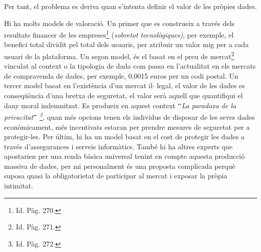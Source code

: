 \documentclass[12pt]{article}
\begin{document}
\begin{enumerate}
\vspace{\baselineskip}
\begin{justify}
Per tant, el problema es deriva quan s’intenta definir el valor de les pròpies dades.
\end{justify}\par

\begin{justify}
Hi ha molts models de valoració. Un primer que es construeix a través dels resultats financer de les empreses\footnote{ Id. Pàg. 270. } (\textit{sobretot tecnològiques)}, per exemple, el benefici total dividit pel total dels usuaris, per atribuir un valor mig per a cada usuari de la plataforma. Un segon model, és el basat en el preu de mercat\footnote{ Id. Pàg. 271. } vinculat al context o la tipologia de dada com passa en l’actualitat en els mercats de compravenda de dades, per exemple, 0,0015 euros per un codi postal. Un tercer model basat en l’existència d’un mercat il$ \cdot $ legal, el valor de les dades es conseqüència d’una bretxa de seguretat, el valor serà aquell que quantifiqui el dany moral indemnitzat. Es produeix en aquest context \textit{$``$La paradoxa de la privacitat$"$ \footnote{ Id. Pàg. 272. }, }quan més opcions tenen els individus de disposar de les seves dades econòmicament, més incentivats estaran per prendre mesures de seguretat per a protegir-les. Per últim, hi ha un model basat en el cost de protegir les dades a través d’assegurances i serveis informàtics. També hi ha altres experts que apostarien per una renda bàsica universal tenint en compte aquesta producció massiva de dades, per mi personalment és una proposta complicada perquè suposa quasi la obligatorietat de participar al mercat i exposar la pròpia intimitat. 
\end{justify}\par


\end{enumerate}
\end{document}
